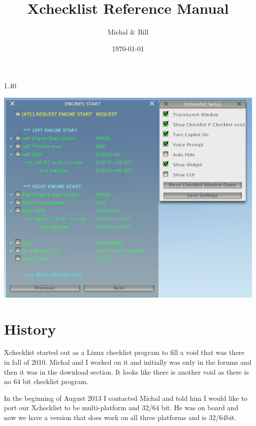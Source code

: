 \documentclass[11pt,parskip=half,a4paper]{scrartcl}
\begin{document}
\title{Xchecklist Reference Manual}
\author{Michal \& Bill}
\date{\today}

\maketitle

\begin{center}
1.40
\end{center}

\vspace{2cm}


\begin{center}
\includegraphics[width=14cm]{TranslucentXchecklist.png}
\end{center}


\thispagestyle{empty}
\newpage
\verb||
\tableofcontents

\newpage
\section{History}

Xchecklist started out as a Linux checklist program to fill a void that was there in fall of 2010. Michal and I worked on it and initially was only in the forums and then it was in the download section. It looks like there is another void as there is no 64 bit checklist program. \newline

In the beginning of August 2013 I contacted Michal and told him I would like to port our Xchecklist to be multi-platform and 32/64 bit. He was on board and now we have a version that does work on all three platforms and is 32/64bit.
\end{document}
